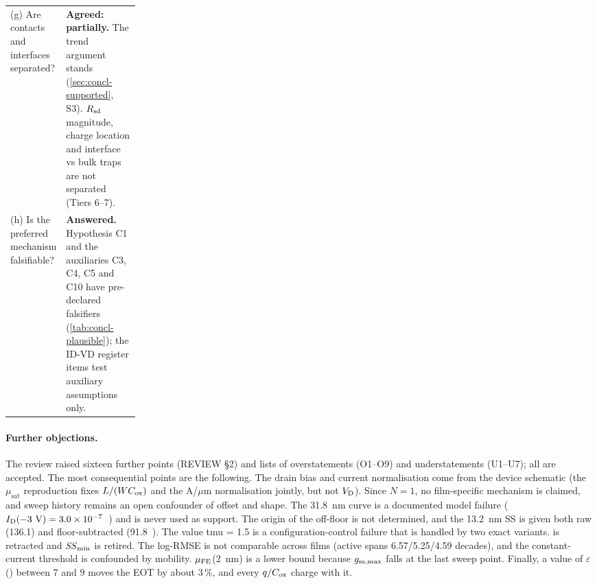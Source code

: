 \begin{table}[tbp]
\begin{tabularx}{\linewidth}{>{\raggedright\arraybackslash}p{0.22\linewidth}>{\raggedright\arraybackslash}X}
    (g) Are contacts and interfaces separated? & \textbf{Agreed: partially.} The trend argument stands (\cref{sec:concl-supported}, S3). $R_{\mathrm{sd}}$ magnitude, charge location and interface vs bulk traps are not separated (Tiers 6--7). \\
    (h) Is the preferred mechanism falsifiable? & \textbf{Answered.} Hypothesis C1 and the auxiliaries C3, C4, C5 and C10 have pre-declared falsifiers (\cref{tab:concl-plausible}); the ID-VD register items test auxiliary assumptions only. \\
    \bottomrule
  \end{tabularx}
\end{table}

\paragraph{Further objections.} The review raised sixteen further points (REVIEW \S 2) and lists of overstatements (O1--O9) and understatements (U1--U7); all are accepted. The most consequential points are the following. The drain bias and current normalisation come from the device schematic (the $\mu_{\mathrm{sat}}$ reproduction fixes $L/(WC_{\mathrm{ox}})$ and the A/$\mu$m normalisation jointly, but not $V_{\mathrm{D}}$). Since $N = 1$, no film-specific mechanism is claimed, and sweep history remains an open confounder of offset and shape. The 31.8~nm curve is a documented model failure ($I_{\mathrm{D}}(-3~\mathrm{V}) = \SI{3.0e-7}{}$~\Aum) and is never used as support. The origin of the off-floor is not determined, and the 13.2~nm SS is given both raw (136.1) and floor-subtracted (91.8~\mVdec). The value tmu = 1.5 is a configuration-control failure that is handled by two exact variants.  is retracted and $\mathit{SS}_{\min}$ is retired. The log-RMSE is not comparable across films (active spans 6.57/5.25/4.59 decades), and the constant-current threshold is confounded by mobility. $\mu_{\mathrm{FE}}$(2~nm) is a lower bound because $g_{\mathrm{m,max}}$ falls at the last sweep point. Finally, a value of $\varepsilon$(\AlO) between 7 and 9 moves the EOT by about 3\,\%, and every $q/C_{\mathrm{ox}}$ charge with it.

